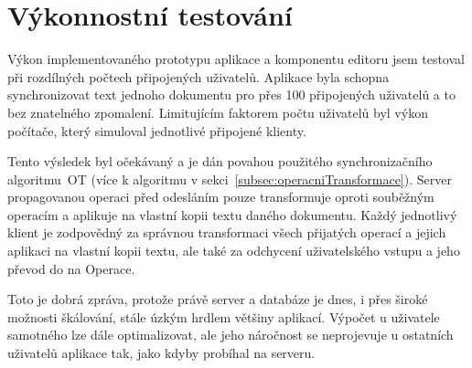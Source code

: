 
\section{Výkonnostní testování}\label{sec:systémovéTestování}

Výkon implementovaného prototypu aplikace a komponentu editoru jsem testoval při rozdílných počtech připojených uživatelů.
Aplikace byla schopna synchronizovat text jednoho dokumentu pro přes 100 připojených uživatelů a to bez znatelného zpomalení.
Limitujícím faktorem počtu uživatelů byl výkon počítače, který simuloval jednotlivé připojené klienty.

Tento výsledek byl očekávaný a je dán povahou použitého synchronizačního algoritmu~\gls{OT} (více k algoritmu v sekci~\ref{subsec:operacniTransformace}).
Server propagovanou operaci před odesláním pouze transformuje oproti souběžným operacím a aplikuje na vlastní kopii textu daného dokumentu.
Každý jednotlivý klient je zodpovědný za správnou transformaci všech přijatých operací a jejich aplikaci na vlastní kopii textu, ale také za odchycení uživatelského vstupu a jeho převod do na Operace.

Toto je dobrá zpráva, protože právě server a databáze je dnes, i přes široké možnosti škálování, stále úzkým hrdlem většiny aplikací.
Výpočet u uživatele samotného lze dále optimalizovat, ale jeho náročnost se neprojevuje u ostatních uživatelů aplikace tak, jako kdyby probíhal na serveru.

